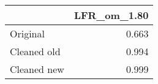 \begin{tabular}{lr}
\toprule
{} & LFR_om_1.80 \\
\midrule
Original    &       0.663 \\
Cleaned old &       0.994 \\
Cleaned new &       0.999 \\
\bottomrule
\end{tabular}
